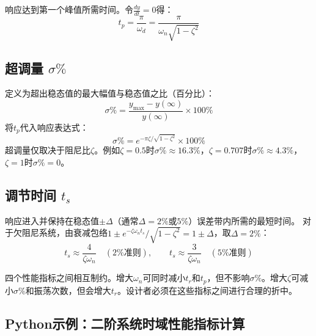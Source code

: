 响应达到第一个峰值所需时间。令$\frac{dy}{dt}=0$得：
\[
t_p = \frac{\pi}{\omega_d} = \frac{\pi}{\omega_n\sqrt{1-\zeta^2}}
\]

\subsection{超调量 $\sigma\%$}

定义为超出稳态值的最大幅值与稳态值之比（百分比）：
\[
\sigma\% = \frac{y_{\max} - y(\infty)}{y(\infty)} \times 100\%
\]
将$t_p$代入响应表达式：
\[
\sigma\% = e^{-\pi\zeta/\sqrt{1-\zeta^2}} \times 100\%
\]
超调量仅取决于阻尼比$\zeta$。例如$\zeta=0.5$时$\sigma\% \approx 16.3\%$，$\zeta=0.707$时$\sigma\% \approx 4.3\%$，$\zeta=1$时$\sigma\%=0$。

\subsection{调节时间 $t_s$}

响应进入并保持在稳态值$\pm\Delta$（通常$\Delta=2\%$或$5\%$）误差带内所需的最短时间。
对于欠阻尼系统，由衰减包络$1\pm e^{-\zeta\omega_n t_s}/\sqrt{1-\zeta^2} = 1\pm\Delta$，取$\Delta=2\%$：
\[
t_s \approx \frac{4}{\zeta\omega_n} \quad (2\%\text{准则}), \qquad
t_s \approx \frac{3}{\zeta\omega_n} \quad (5\%\text{准则})
\]

\begin{remark}
四个性能指标之间相互制约。增大$\omega_n$可同时减小$t_r$和$t_p$，但不影响$\sigma\%$。增大$\zeta$可减小$\sigma\%$和振荡次数，但会增大$t_r$。设计者必须在这些指标之间进行合理的折中。
\end{remark}

\subsection*{Python示例：二阶系统时域性能指标计算}

